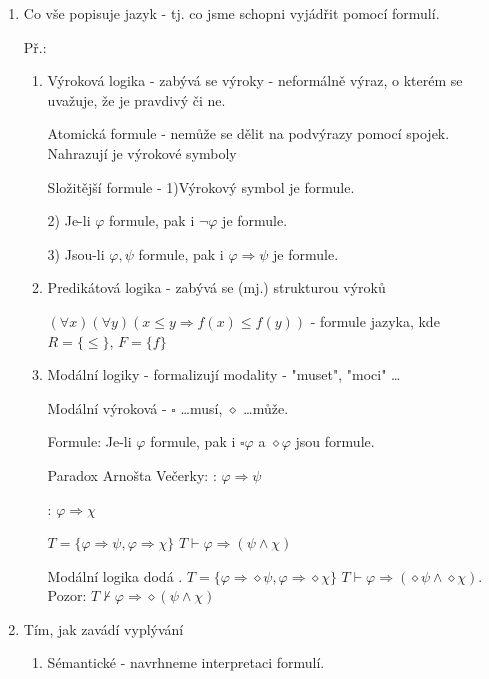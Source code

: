 \documentclass[10pt, a4paper, titlepage]{article}
\theoremstyle{note}
\begin{document}
\begin{enumerate}
\item Co vše popisuje jazyk - tj. co jsme schopni vyjádřit pomocí formulí.

  Př.:
  \begin{enumerate}
    \item Výroková logika - zabývá se výroky - neformálně výraz, o kterém se uvažuje, že je pravdivý či ne. 

      Atomická formule - nemůže se dělit na podvýrazy pomocí spojek. Nahrazují je výrokové symboly

      Složitější formule - 1)Výrokový symbol je formule.

			   2) Je-li $\varphi$ formule, pak i $\neg \varphi$ je formule.

			   3) Jsou-li $\varphi ,\psi$ formule, pak i $\varphi \Rightarrow \psi$ je formule.
  \item Predikátová logika - zabývá se (mj.) strukturou výroků

      $(\forall x)(\forall y) (x \leq y \Rightarrow f(x) \leq f(y))$ - formule jazyka, kde $R = \{\leq\}$, $F = \{f\}$

  \item Modální logiky - formalizují modality - "muset", "moci" \dots

      Modální výroková - $\square$ \dots musí, $\diamond$ \dots může.

	Formule: Je-li $\varphi$ formule, pak i $\square\varphi$ a $\diamond\varphi$ jsou formule.

  Paradox Arnošta Večerky: :  $\varphi \Rightarrow\psi$

  : $\varphi \Rightarrow \chi$

  $T=\{\varphi\Rightarrow\psi , \varphi\Rightarrow\chi\}$  $T \vdash \varphi\Rightarrow(\psi \wedge \chi)$
    
Modální logika dodá .
  $T=\{\varphi\Rightarrow\diamond\psi,\varphi\Rightarrow\diamond\chi\}$ $T\vdash\varphi\Rightarrow(\diamond\psi\wedge\diamond\chi)$. Pozor: $T \not\vdash \varphi\Rightarrow\diamond (\psi\wedge\chi)$
  \end{enumerate}

\item Tím, jak zavádí vyplývání
  \begin{enumerate}
    \item Sémantické - navrhneme interpretaci formulí.


\end{enumerate}
\end{enumerate}
\end{document}
